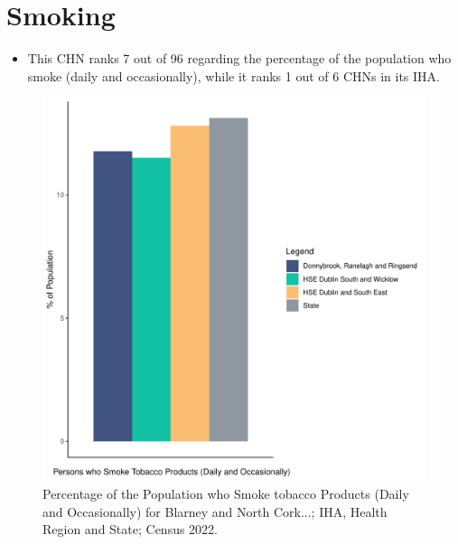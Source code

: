 \documentclass{article}
\begin{document}
\pagebreak

\section{Smoking}\label{sect:Smoking}
\begin{itemize}
\item This CHN ranks  7 out of 96 regarding the percentage of the population who smoke (daily and occasionally), while it ranks   1 out of 6 CHNs in its IHA.
\end{itemize}
\begin{figure}[H]
	\centering
	\includegraphics[width = 120mm]{../figures/SmokingED.pdf}
	\caption{Percentage of the Population who Smoke tobacco Products (Daily and Occasionally) for Blarney and North Cork...; IHA, Health Region and State; Census 2022.}
	\label{fig:2ae19629-1a6a-13a3-e055-000000000001}
	\end{figure}
	
\end{document}
